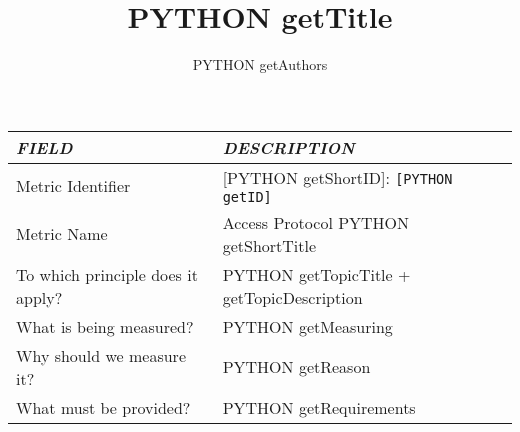 \documentclass[english]{article}
\begin{document}
\title{ PYTHON getTitle}

\author{ PYTHON getAuthors }

\maketitle

\newpage

\begin{longtable}{|p{5cm}|p{9cm}|}

\hline
\emph{FIELD} & \emph{DESCRIPTION} \\

\hline
Metric Identifier &
[PYTHON getShortID]: \verb"[PYTHON getID]"
\\

\hline
Metric Name &
Access Protocol
PYTHON getShortTitle

\\

\hline
To which principle does it apply? &

PYTHON getTopicTitle + getTopicDescription

\\

\hline
What is being measured? &

PYTHON getMeasuring


\\

\hline
Why should we measure it? &

PYTHON getReason

\\

\hline
What must be provided? &

PYTHON getRequirements


\end{longtable}
\end{document}
